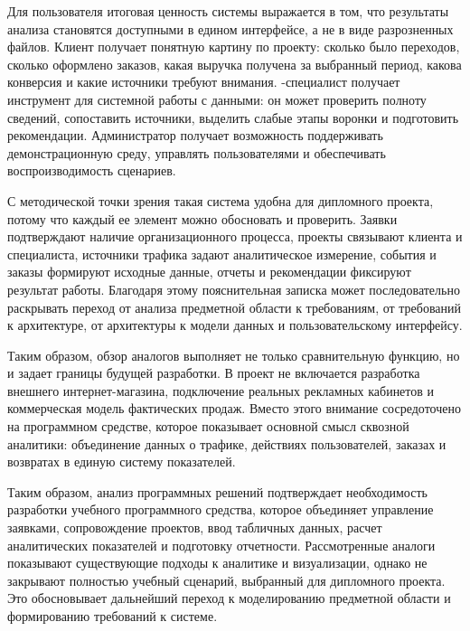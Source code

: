 Для пользователя итоговая ценность системы выражается в том, что результаты анализа становятся доступными в едином интерфейсе, а не в виде разрозненных файлов. Клиент получает понятную картину по проекту: сколько было переходов, сколько оформлено заказов, какая выручка получена за выбранный период, какова конверсия и какие источники требуют внимания. -специалист получает инструмент для системной работы с данными: он может проверить полноту сведений, сопоставить источники, выделить слабые этапы воронки и подготовить рекомендации. Администратор получает возможность поддерживать демонстрационную среду, управлять пользователями и обеспечивать воспроизводимость сценариев.

С методической точки зрения такая система удобна для дипломного проекта, потому что каждый ее элемент можно обосновать и проверить. Заявки подтверждают наличие организационного процесса, проекты связывают клиента и специалиста, источники трафика задают аналитическое измерение, события и заказы формируют исходные данные, отчеты и рекомендации фиксируют результат работы. Благодаря этому пояснительная записка может последовательно раскрывать переход от анализа предметной области к требованиям, от требований к архитектуре, от архитектуры к модели данных и пользовательскому интерфейсу.

Таким образом, обзор аналогов выполняет не только сравнительную функцию, но и задает границы будущей разработки. В проект не включается разработка внешнего интернет-магазина, подключение реальных рекламных кабинетов и коммерческая модель фактических продаж. Вместо этого внимание сосредоточено на программном средстве, которое показывает основной смысл сквозной аналитики: объединение данных о трафике, действиях пользователей, заказах и возвратах в единую систему показателей.

Таким образом, анализ программных решений подтверждает необходимость разработки учебного программного средства, которое объединяет управление заявками, сопровождение проектов, ввод табличных данных, расчет аналитических показателей и подготовку отчетности. Рассмотренные аналоги показывают существующие подходы к аналитике и визуализации, однако не закрывают полностью учебный сценарий, выбранный для дипломного проекта. Это обосновывает дальнейший переход к моделированию предметной области и формированию требований к системе.
